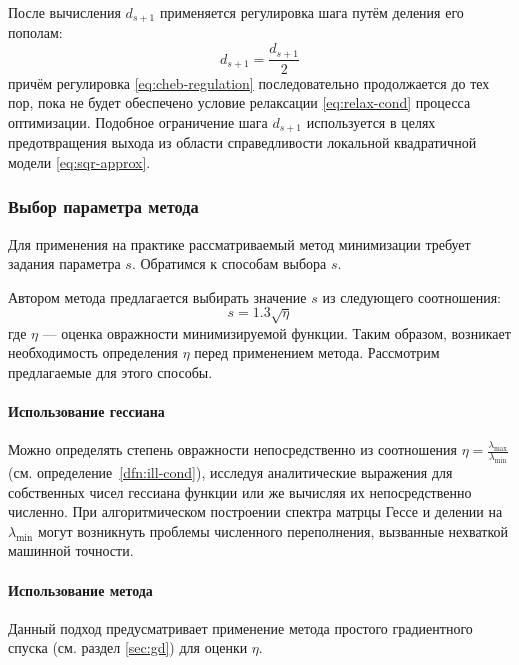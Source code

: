 После вычисления $d_{s+1}$ применяется регулировка шага путём деления
его пополам:
\begin{equation}
  \label{eq:cheb-regulation}
  d_{s+1} = \frac{d_{s+1}}{2}
\end{equation}
причём регулировка \eqref{eq:cheb-regulation} последовательно
продолжается до тех пор, пока не будет обеспечено условие релаксации
\eqref{eq:relax-cond} процесса оптимизации. Подобное ограничение шага
$d_{s+1}$ используется в целях предотвращения выхода из области
справедливости локальной квадратичной модели \eqref{eq:sqr-approx}.

\subsubsection{Выбор параметра метода}
\label{sec:cheb-param}

Для применения на практике рассматриваемый метод минимизации требует
задания параметра $s$. Обратимся к способам выбора $s$.

Автором метода предлагается выбирать значение $s$ из следующего
соотношения:
\begin{equation}
  \label{eq:cheb-param}
  s = 1.3 \sqrt{\eta}
\end{equation}
где $\eta$ — оценка овражности минимизируемой функции. Таким образом,
возникает необходимость определения $\eta$ перед применением метода.
Рассмотрим предлагаемые для этого способы.

\paragraph{Использование гессиана}

Можно определять степень овражности непосредственно из соотношения
$\eta=\frac{\lambda_{\max}}{\lambda_{\min}}$ (см.
определение \ref{dfn:ill-cond}), исследуя аналитические выражения для
собственных чисел гессиана функции или же вычисляя их непосредственно
численно. При алгоритмическом построении спектра матрцы Гессе и
делении на $\lambda_{\min}$ могут возникнуть проблемы численного
переполнения, вызванные нехваткой машинной точности.

\paragraph{Использование метода \gd{}}

Данный подход предусматривает применение метода простого градиентного
спуска (см. раздел \ref{sec:gd}) для оценки $\eta$. 

